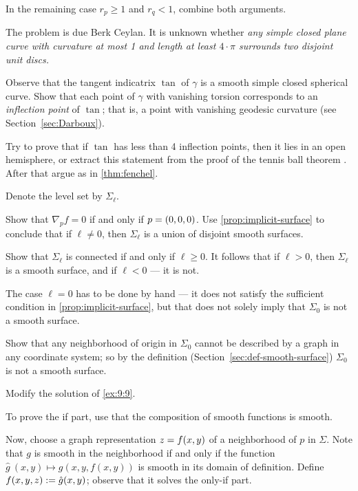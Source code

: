\begin{multicols}{2}
In the remaining case $r_p\ge 1$ and $r_q<1$, combine both arguments.

 The problem is due Berk Ceylan.
It is unknown whether \textit{any simple closed plane curve with curvature at most 1 and length at least $4\cdot\pi$ surrounds two disjoint unit discs.}

Observe that the tangent indicatrix $\tan$ of $\gamma$ is a smooth simple closed spherical curve.
Show that each point of $\gamma$ with vanishing torsion corresponds to an {}\emph{inflection point} of $\tan$;
that is, a point with vanishing geodesic curvature (see Section~\ref{sec:Darboux}).

Try to prove that if $\tan$ has less than 4 inflection points, then it lies in an open hemisphere,
or extract this statement from the proof of the tennis ball theorem \cite[§ 20]{arnold1994}.
After that argue as in \ref{thm:fenchel}.



\setcounter{eqtn}{0}

Denote the level set by $\Sigma_\ell$.

Show that $\nabla_p f=0$ if and only if $p\z=(0,0,0)$.
Use \ref{prop:implicit-surface} to conclude that if $\ell\ne 0$, then $\Sigma_\ell$ is a union of disjoint smooth surfaces.

Show that $\Sigma_\ell$ is connected if and only if $\ell\ge 0$.
It follows that if $\ell>0$, then $\Sigma_\ell$ is a smooth surface, and if $\ell<0$ --- it is not.

The case $\ell=0$ has to be done by hand --- it does not satisfy the sufficient condition in \ref{prop:implicit-surface}, but that does not solely imply that $\Sigma_0$ is not a smooth surface.

Show that any neighborhood of origin in $\Sigma_0$ cannot be described by a graph in any coordinate system;
so by the definition (Section~\ref{sec:def-smooth-surface}) $\Sigma_0$ is not a smooth surface.

 Modify the solution of \ref{ex:9:9}.

To prove the if part, use that the composition of smooth functions is smooth.

Now, choose a graph representation $z\z=f(x,y)$ of a neighborhood of $p$ in $\Sigma$.
Note that $g$ is smooth in the neighborhood if and only if the function $\hat g\:(x,y)\mapsto g(x,y,f(x,y))$ is smooth in its domain of definition.
Define $f(x,y,z)\z\df \hat g(x,y)$; observe that it solves the only-if part.


\end{multicols}
